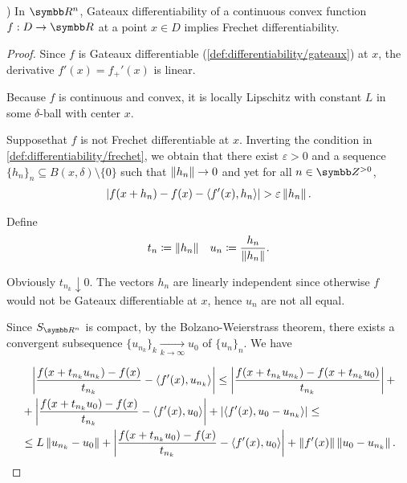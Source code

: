 \begin{theorem}\label{thm:rn_continuous_convex_gateaux_implies_frechet}\cite[exercise 1.15(a]{Phelps1993})
  In \( \R^n \), Gateaux differentiability of a continuous convex function \( f: D \to \R \) at a point \( x \in D \) implies Frechet differentiability.
\end{theorem}
\begin{proof}
  Since \( f \) is Gateaux differentiable (\cref{def:differentiability/gateaux}) at \( x \), the derivative \( f'(x) = f_+'(x) \) is linear.

  Because \( f \) is continuous and convex, it is locally Lipschitz with constant \( L \) in some \( \delta \)-ball with center \( x \).

  Suppose\LEM that \( f \) is not Frechet differentiable at \( x \). Inverting the condition in \cref{def:differentiability/frechet}, we obtain that there exist \( \varepsilon > 0 \) and a sequence \( \{ h_n \}_n \subseteq B(x, \delta) \setminus \{ 0 \} \) such that \( \left\Vert h_n \right\Vert \to 0 \) and yet for all \( n \in \Z^{>0} \),
  \begin{align}\label{thm:rn_continuous_convex_gateaux_implies_frechet/frechet_assumption}
    \left\vert f(x + h_n) - f(x) - \left\langle f'(x), h_n \right\rangle \right\vert > \varepsilon \left\Vert h_n \right\Vert.
  \end{align}

  Define
  \begin{align*}
    t_n \coloneqq \left\Vert h_n \right\Vert
    &&
    u_n \coloneqq \frac{h_n} {\left\Vert h_n \right\Vert}.
  \end{align*}

  Obviously \( t_{n_k} \downarrow 0 \). The vectors \( h_n \) are linearly independent since otherwise \( f \) would not be Gateaux differentiable at \( x \), hence \( u_n \) are not all equal.

  Since \( S_{\R^n} \) is compact\USC, by the Bolzano-Weierstrass theorem, there exists a convergent subsequence \( \{ u_{n_k} \}_k \underset {k \to \infty} \to u_0 \) of \( \{ u_n \}_n \). We have

  \begin{align}\label{thm:rn_continuous_convex_gateaux_implies_frechet/frechet_estimate}
    &\phantom= \Abs{\frac {f(x + t_{n_k} u_{n_k}) - f(x)} {t_{n_k}} - \Prod{f'(x)} {u_{n_k}}}
    \leq \nonumber
    \Abs{\frac {f(x + t_{n_k} u_{n_k}) - f(x + t_{n_k} u_0)} {t_{n_k}}} + \\ &+ \Abs{\frac {f(x + t_{n_k} u_0) - f(x)} {t_{n_k}} - \Prod{f'(x)} {u_0}} + \Abs{\Prod{f'(x)} {u_0 - u_{n_k}}}
    \leq \nonumber \\ &\leq
    L \Norm{u_{n_k} - u_0} + \Abs{\frac {f(x + t_{n_k} u_0) - f(x)} {t_{n_k}} - \Prod{f'(x)} {u_0}} + \Norm{f'(x)} \Norm{u_0 - u_{n_k}}.
  \end{align}


\end{proof}
